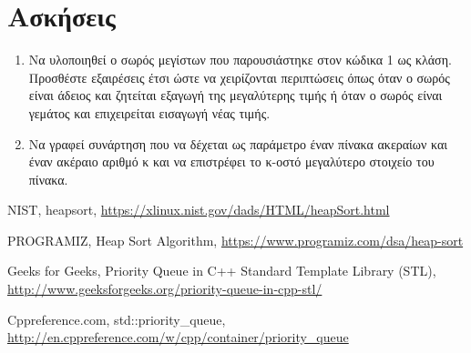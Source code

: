 




\section{Ασκήσεις}
\begin{enumerate}
\item Να υλοποιηθεί ο σωρός μεγίστων που παρουσιάστηκε στον κώδικα 1 ως κλάση. Προσθέστε εξαιρέσεις έτσι ώστε να χειρίζονται περιπτώσεις όπως όταν ο σωρός είναι άδειος και ζητείται εξαγωγή της μεγαλύτερης τιμής ή όταν ο σωρός είναι γεμάτος και επιχειρείται εισαγωγή νέας τιμής.
\item Να γραφεί συνάρτηση που να δέχεται ως παράμετρο έναν πίνακα ακεραίων και έναν ακέραιο αριθμό κ και να επιστρέφει το κ-οστό μεγαλύτερο στοιχείο του πίνακα. 
\end{enumerate}

\begin{thebibliography}{9}
NIST, heapsort, \href{https://xlinux.nist.gov/dads/HTML/heapSort.html}{https://xlinux.nist.gov/dads/HTML/heapSort.html}

PROGRAMIZ, Heap Sort Algorithm, \href{https://www.programiz.com/dsa/heap-sort}{https://www.programiz.com/dsa/heap-sort}

Geeks for Geeks, Priority Queue in C++ Standard Template Library (STL), \href{http://www.geeksforgeeks.org/priority-queue-in-cpp-stl/}{http://www.geeksforgeeks.org/priority-queue-in-cpp-stl/}

Cppreference.com, std::priority\_queue, \href{http://en.cppreference.com/w/cpp/container/priority_queue}{http://en.cppreference.com/w/cpp/container/priority\_queue}

\end{thebibliography}

